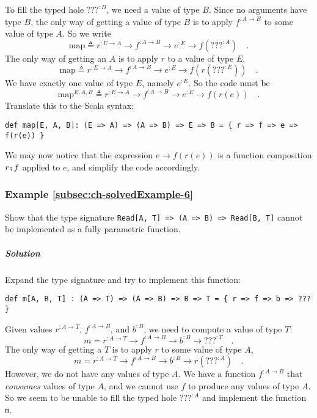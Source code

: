 To fill the typed hole $\text{???}^{:B}$, we need a value of type
$B$. Since no arguments have type $B$, the only way of getting a
value of type $B$ is to apply $f^{:A\rightarrow B}$ to some value
of type $A$. So we write
\[
\text{map}\triangleq r^{:E\rightarrow A}\rightarrow f^{:A\rightarrow B}\rightarrow e^{:E}\rightarrow f(???^{:A})\quad.
\]
The only way of getting an $A$ is to apply $r$ to a value of type
$E$,
\[
\text{map}\triangleq r^{:E\rightarrow A}\rightarrow f^{:A\rightarrow B}\rightarrow e^{:E}\rightarrow f(r(???^{:E}))\quad.
\]
We have exactly one value of type $E$, namely $e^{:E}$. So the code
must be 
\[
\text{map}^{E,A,B}\triangleq r^{:E\rightarrow A}\rightarrow f^{:A\rightarrow B}\rightarrow e^{:E}\rightarrow f(r(e))\quad.
\]
Translate this to the Scala syntax:
\begin{lstlisting}
def map[E, A, B]: (E => A) => (A => B) => E => B = { r => f => e => f(r(e)) }
\end{lstlisting}
We may now notice that the expression $e\rightarrow f(r(e))$ is a
function composition $r\bef f$ applied to $e$, and simplify the
code accordingly.

\subsubsection{Example \label{subsec:ch-solvedExample-6}\ref{subsec:ch-solvedExample-6}}

Show that the type signature \lstinline!Read[A, T] => (A => B) => Read[B, T]!
cannot be implemented as a fully parametric function.

\subparagraph{Solution}

Expand the type signature and try to implement this function:
\begin{lstlisting}
def m[A, B, T] : (A => T) => (A => B) => B => T = { r => f => b => ??? }
\end{lstlisting}
Given values $r^{:A\rightarrow T}$, $f^{:A\rightarrow B}$, and $b^{:B}$,
we need to compute a value of type $T$:
\[
m=r^{:A\rightarrow T}\rightarrow f^{:A\rightarrow B}\rightarrow b^{:B}\rightarrow???^{:T}\quad.
\]
The only way of getting a $T$ is to apply $r$ to some value of type
$A$,
\[
m=r^{:A\rightarrow T}\rightarrow f^{:A\rightarrow B}\rightarrow b^{:B}\rightarrow r(???^{:A})\quad.
\]
However, we do not have any values of type $A$. We have a function
$f^{:A\rightarrow B}$ that \emph{consumes} values of type $A$, and
we cannot use $f$ to produce any values of type $A$. So we seem
to be unable to fill the typed hole $\text{???}^{:A}$ and implement
the function \lstinline!m!.

